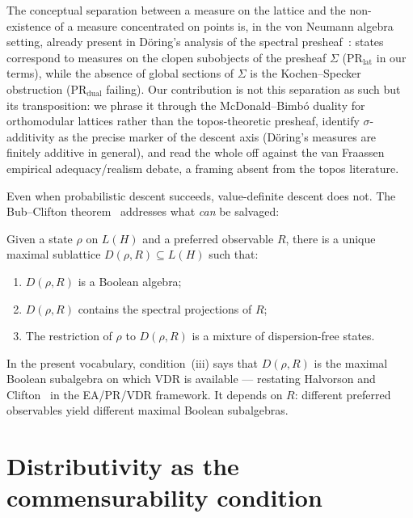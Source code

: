 The conceptual separation between a measure on the lattice and the
non-existence of a measure concentrated on points is, in the von
Neumann algebra setting, already present in D\"{o}ring's analysis of
the spectral presheaf~\cite{Doring2008}: states correspond to measures
on the clopen subobjects of the presheaf $\Sigma$
($\text{PR}_{\text{lat}}$ in our terms), while the absence of global
sections of $\Sigma$ is the Kochen--Specker obstruction
($\text{PR}_{\text{dual}}$ failing).  Our contribution is not this
separation as such but its transposition: we phrase it through the
McDonald--Bimb\'{o} duality for orthomodular lattices rather than the
topos-theoretic presheaf, identify $\sigma$-additivity as the precise
marker of the descent axis (D\"{o}ring's measures are finitely additive
in general), and read the whole off against the van Fraassen empirical
adequacy/realism debate, a framing absent from the topos literature.

Even when probabilistic descent succeeds, value-definite descent
does not.  The Bub--Clifton
theorem~\cite{BubClifton1996} addresses what \emph{can} be
salvaged:

\begin{theorem}
\label{thm:bub-clifton}
Given a state $\rho$ on $L(H)$ and a preferred observable $R$,
there is a unique maximal sublattice
$D(\rho, R) \subseteq L(H)$ such that:
\begin{enumerate}[label=(\roman*)]
  \item $D(\rho, R)$ is a Boolean algebra;
  \item $D(\rho, R)$ contains the spectral projections of $R$;
  \item The restriction of $\rho$ to $D(\rho, R)$ is a mixture of
    dispersion-free states.
\end{enumerate}
\end{theorem}

\noindent In the present vocabulary, condition~(iii) says that
$D(\rho, R)$ is the maximal Boolean subalgebra on which VDR is
available --- restating Halvorson and
Clifton~\cite{HalvorsonClifton1999} in the EA/PR/VDR framework.
It depends on $R$: different preferred observables yield different
maximal Boolean subalgebras.

\section{Distributivity as the commensurability condition}
\label{sec:commensurability}

